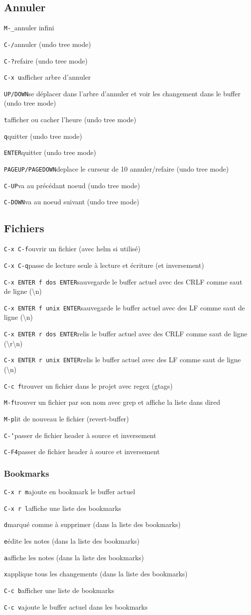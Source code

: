 \documentclass[10pt,landscape]{article}
\def\cm#1#2{{\tt#1}\dotfill#2\par}
\begin{document}
\begin{multicols}{3}
\subsection{Annuler}
\cm{M-\_}{annuler infini}
\cm{C-/}{annuler (undo tree mode)}
\cm{C-?}{refaire (undo tree mode)}
\cm{C-x u}{afficher arbre d'annuler}
\cm{UP/DOWN}{se déplacer dans l'arbre d'annuler et voir les changement dans le buffer (undo tree mode)}
\cm{t}{afficher ou cacher l'heure (undo tree mode)}
\cm{q}{quitter (undo tree mode)}
\cm{ENTER}{quitter (undo tree mode)}
\cm{PAGEUP/PAGEDOWN}{deplace le curseur de 10 annuler/refaire (undo tree mode)}
\cm{C-UP}{va au précédant noeud (undo tree mode)}
\cm{C-DOWN}{va au noeud suivant (undo tree mode)}





\subsection{Fichiers}
\cm{C-x C-f}{ouvrir un fichier (avec helm si utilisé)}
\cm{C-x C-q}{passe de lecture seule à lecture et écriture (et inversement)}
\cm{C-x ENTER f dos ENTER}{sauvegarde le buffer actuel avec des CRLF comme saut de ligne (\textbackslash n)}
\cm{C-x ENTER f unix ENTER}{sauvegarde le buffer actuel avec des LF comme saut de ligne (\textbackslash n)}
\cm{C-x ENTER r dos ENTER}{relis le buffer actuel avec des CRLF comme saut de ligne (\textbackslash r\textbackslash n)}
\cm{C-x ENTER r unix ENTER}{relis le buffer actuel avec des LF comme saut de ligne (\textbackslash n)}
\cm{C-c f}{trouver un fichier dans le projet avec regex (gtags)}
\cm{M-f}{trouver un fichier par son nom avec grep et affiche la liste dans dired}
\cm{M-p}{lit de nouveau le fichier (revert-buffer)}
\cm{C-`}{passer de fichier header à source et inversement}
\cm{C-F4}{passer de fichier header à source et inversement}

\subsubsection{Bookmarks}
\cm{C-x r m}{ajoute en bookmark le buffer actuel}
\cm{C-x r l}{affiche une liste des bookmarks}
\cm{d}{marqué comme à supprimer (dans la liste des bookmarks)}
\cm{e}{édite les notes (dans la liste des bookmarks)}
\cm{a}{affiche les notes (dans la liste des bookmarks)}
\cm{x}{applique tous les changements (dans la liste des bookmarks)}
\cm{C-c b}{afficher une liste de bookmarks}
\cm{C-c v}{ajoute le buffer actuel dans les bookmarks}




\end{multicols}
\end{document}
